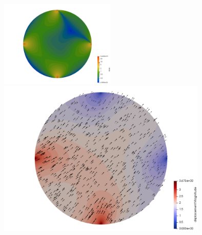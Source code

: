 \begin{center}
\includegraphics[width=5.5cm]{python_codes/fieldstone_58/experiment2/strain}\\
\includegraphics[width=10cm]{python_codes/fieldstone_58/experiment2/dispvect}
\end{center}






